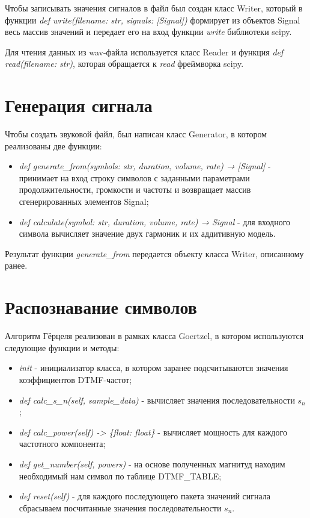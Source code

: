 Чтобы записывать значения сигналов в файл был создан класс Writer, который в функции \textit{def write(filename: str, signals: [Signal])} формирует из объектов Signal весь массив значений и передает его на вход функции \textit{write} библиотеки scipy.

Для чтения данных из wav-файла используется класс Reader и функция \textit{def read(filename: str)}, которая обращается к \textit{read} фреймворка scipy.

\section{Генерация сигнала}

Чтобы создать звуковой файл, был написан класс Generator, в котором реализованы две функции:

\begin{itemize}
	\item \textit{def generate\_from(symbols: str, duration, volume, rate) → [Signal]} - принимает на вход строку символов с заданными параметрами продолжительности, громкости и частоты и возвращает массив сгенерированных элементов Signal;
	\item \textit{def calculate(symbol: str, duration, volume, rate) → Signal} - для входного символа вычисляет значение двух гармоник и их аддитивную модель.
\end{itemize}

Результат функции \textit{generate\_from} передается объекту класса Writer, описанному ранее.

\section{Распознавание символов}

Алгоритм Гёрцеля реализован в рамках класса Goertzel, в котором используются следующие функции и методы:

\begin{itemize}
	\item \textit{init} - инициализатор класса, в котором заранее подсчитываются значения коэффициентов DTMF-частот;
	\item \textit{def calc\_s\_n(self, sample\_data)} - вычисляет значения последовательности $s_n$;
	\item \textit{def calc\_power(self) -> \{float: float\}} - вычисляет мощность для каждого частотного компонента;
	\item \textit{def get\_number(self, powers)} - на основе полученных магнитуд находим необходимый нам символ по таблице DTMF\_TABLE;
	\item \textit{def reset(self)} - для каждого последующего пакета значений сигнала сбрасываем посчитанные значения последовательности $s_n$.
\end{itemize}

